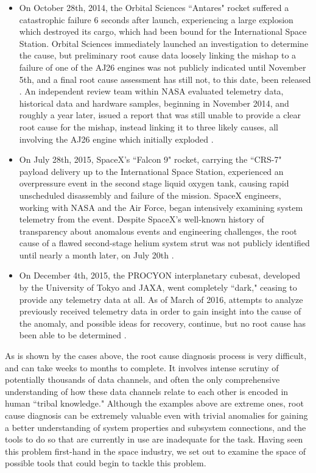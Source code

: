\begin{itemize}

\item On October 28th, 2014, the Orbital Sciences ``Antares" rocket suffered a catastrophic failure 6 seconds after launch, experiencing a large explosion which destroyed its cargo, which had been bound for the International Space Station. Orbital Sciences immediately launched an investigation to determine the cause, but preliminary root cause data loosely linking the mishap to a failure of one of the AJ26 engines was not publicly indicated until November 5th, and a final root cause assessment has still not, to this date, been released \cite{spaceflight_antares}. An independent review team within NASA evaluated telemetry data, historical data and hardware samples, beginning in November 2014, and roughly a year later, issued a report that was still unable to provide a clear root cause for the mishap, instead linking it to three likely causes, all involving the AJ26 engine which initially exploded \cite{nasa_orb3}.

\item On July 28th, 2015, SpaceX's ``Falcon 9" rocket, carrying the ``CRS-7" payload delivery up to the International Space Station, experienced an overpressure event in the second stage liquid oxygen tank, causing rapid unscheduled disassembly and failure of the mission. SpaceX engineers, working with NASA and the Air Force, began intensively examining system telemetry from the event. Despite SpaceX's well-known history of transparency about anomalous events and engineering challenges, the root cause of a flawed second-stage helium system strut was not publicly identified until nearly a month later, on July 20th \cite{spacex_crs7}.

\item On December 4th, 2015, the PROCYON interplanetary cubesat, developed by the University of Tokyo and JAXA, went completely ``dark," ceasing to provide any telemetry data at all. As of March of 2016, attempts to analyze previously received telemetry data in order to gain insight into the cause of the anomaly, and possible ideas for recovery, continue, but no root cause has been able to be determined \cite{procyon_status}.

\end{itemize}

As is shown by the cases above, the root cause diagnosis process is very difficult, and can take weeks to months to complete. It involves intense scrutiny of potentially thousands of data channels, and often the only comprehensive understanding of how these data channels relate to each other is encoded in human ``tribal knowledge." Although the examples above are extreme ones, root cause diagnosis can be extremely valuable even with trivial anomalies for gaining a better understanding of system properties and subsystem connections, and the tools to do so that are currently in use are inadequate for the task. Having seen this problem first-hand in the space industry, we set out to examine the space of possible tools that could begin to tackle this problem.

